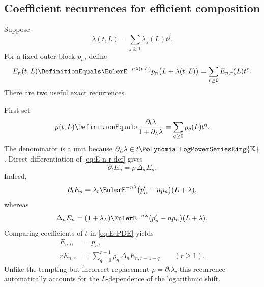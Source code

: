 \documentclass[11pt]{article}
\theoremstyle{pltheorem}
\newcommand{\K}{\mathbb K}
\newcommand{\PL}{\PolynomialLogPowerSeriesRing{\K}}
\begin{document}
\subsection{Coefficient recurrences for efficient composition}

Suppose
\begin{equation}\label{eq:lambda-coefficients}
 \lambda(t,L)=\sum_{j\ge1}\lambda_j(L)t^j.
\end{equation}
For a fixed outer block \(p_n\), define
\begin{equation}\label{eq:E-n-r-def}
 E_n(t,L)\DefinitionEquals\EulerE^{-n\lambda(t,L)}p_n\bigl(L+\lambda(t,L)\bigr)
 =\sum_{r\ge0}E_{n,r}(L)t^r.
\end{equation}
There are two useful exact recurrences.

First set
\begin{equation}\label{eq:rho-composition}
 \rho(t,L)\DefinitionEquals\frac{\partial_t\lambda}{1+\partial_L\lambda}
 =\sum_{q\ge0}\rho_q(L)t^q.
\end{equation}
The denominator is a unit because \(\partial_L\lambda\in t\PL\).  Direct
differentiation of \cref{eq:E-n-r-def} gives
\begin{equation}\label{eq:E-PDE}
 \partial_tE_n=\rho\,\Delta_nE_n.
\end{equation}
Indeed,
\[
 \partial_tE_n=\lambda_t\EulerE^{-n\lambda}
 \bigl(p_n'-np_n\bigr)(L+\lambda),
\]
whereas
\[
 \Delta_nE_n=(1+\lambda_L)\EulerE^{-n\lambda}
 \bigl(p_n'-np_n\bigr)(L+\lambda).
\]
Comparing coefficients of \(t\) in \cref{eq:E-PDE} yields
\begin{align}
 E_{n,0}&=p_n,\label{eq:E-rec-0}\\
 rE_{n,r}&=\sum_{q=0}^{r-1}\rho_q\,\Delta_nE_{n,r-1-q}
 \qquad(r\ge1).\label{eq:E-rec-r}
\end{align}
Unlike the tempting but incorrect replacement
\(\rho=\partial_t\lambda\), this recurrence automatically accounts for
the \(L\)-dependence of the logarithmic shift.
\end{document}
